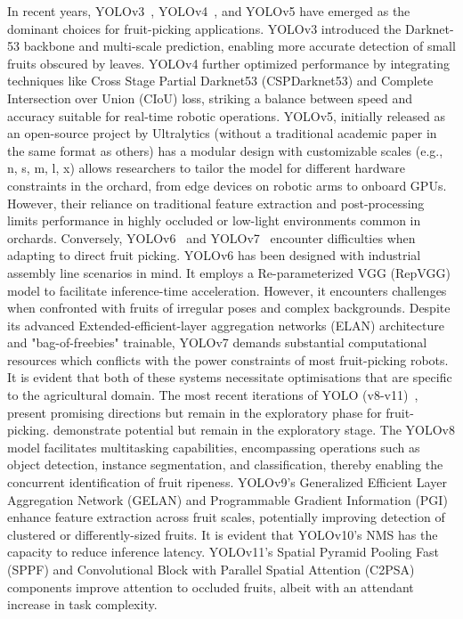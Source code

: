 \documentclass[a4paper,fleqn]{cas-dc}
\begin{document}
In recent years, YOLOv3~\cite{redmon2018yolov3}, YOLOv4~\cite{bochkovskiy2020yolov4}, and YOLOv5 have emerged as the dominant choices for fruit-picking applications. YOLOv3 introduced the Darknet-53 backbone and multi-scale prediction, enabling more accurate detection of small fruits obscured by leaves. YOLOv4 further optimized performance by integrating techniques like Cross Stage Partial Darknet53 (CSPDarknet53) and Complete Intersection over Union (CIoU) loss, striking a balance between speed and accuracy suitable for real-time robotic operations. YOLOv5, initially released as an open-source project by Ultralytics (without a traditional academic paper in the same format as others) has a modular design with customizable scales (e.g., n, s, m, l, x) allows researchers to tailor the model for different hardware constraints in the orchard, from edge devices on robotic arms to onboard GPUs. However, their reliance on traditional feature extraction and post-processing limits performance in highly occluded or low-light environments common in orchards.
Conversely, YOLOv6~\cite{li2022yolov6} and YOLOv7~\cite{wang2023yolov7} encounter difficulties when adapting to direct fruit picking. YOLOv6 has been designed with industrial assembly line scenarios in mind. It employs a Re-parameterized VGG (RepVGG) model to facilitate inference-time acceleration.  However, it encounters challenges when confronted with fruits of irregular poses and complex backgrounds. 
Despite its advanced Extended-efficient-layer aggregation networks (ELAN) architecture and  "bag-of-freebies" trainable, YOLOv7 demands substantial computational resources which conflicts with the power constraints of most fruit-picking robots. It is evident that both of these systems necessitate optimisations that are specific to the agricultural domain. 
The most recent iterations of YOLO (v8-v11)~\cite{yaseen2024yolov9, wang2024yolov10, khanam2410yolov11}, present promising directions but remain in the exploratory phase for fruit-picking. demonstrate potential but remain in the exploratory stage. The YOLOv8 model facilitates multitasking capabilities, encompassing operations such as object detection, instance segmentation, and classification, thereby enabling the concurrent identification of fruit ripeness. YOLOv9's Generalized Efficient Layer Aggregation Network (GELAN) and Programmable Gradient Information (PGI) enhance feature extraction across fruit scales, potentially improving detection of clustered or differently-sized fruits. It is evident that YOLOv10's NMS has the capacity to reduce inference latency. YOLOv11's Spatial Pyramid Pooling Fast (SPPF) and Convolutional Block with Parallel Spatial Attention (C2PSA) components improve attention to occluded fruits, albeit with an attendant increase in task complexity.
\end{document}
